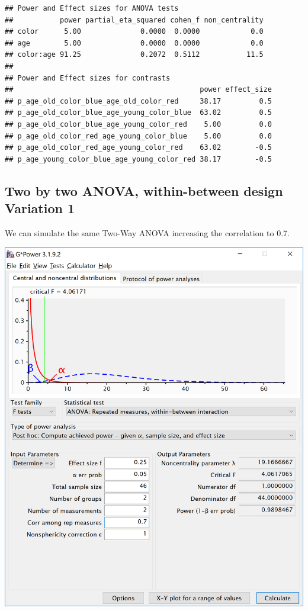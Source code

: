 \documentclass[]{book}
\begin{document}
\begin{verbatim}
## Power and Effect sizes for ANOVA tests
##           power partial_eta_squared cohen_f non_centrality
## color      5.00              0.0000  0.0000            0.0
## age        5.00              0.0000  0.0000            0.0
## color:age 91.25              0.2072  0.5112           11.5
## 
## Power and Effect sizes for contrasts
##                                            power effect_size
## p_age_old_color_blue_age_old_color_red     38.17         0.5
## p_age_old_color_blue_age_young_color_blue  63.02         0.5
## p_age_old_color_blue_age_young_color_red    5.00         0.0
## p_age_old_color_red_age_young_color_blue    5.00         0.0
## p_age_old_color_red_age_young_color_red    63.02        -0.5
## p_age_young_color_blue_age_young_color_red 38.17        -0.5
\end{verbatim}

\hypertarget{two-by-two-anova-within-between-design-variation-1}{%
\subsection{Two by two ANOVA, within-between design Variation 1}\label{two-by-two-anova-within-between-design-variation-1}}

We can simulate the same Two-Way ANOVA increasing the correlation to 0.7.

\includegraphics{screenshots/gpower_6.png}
\end{document}
